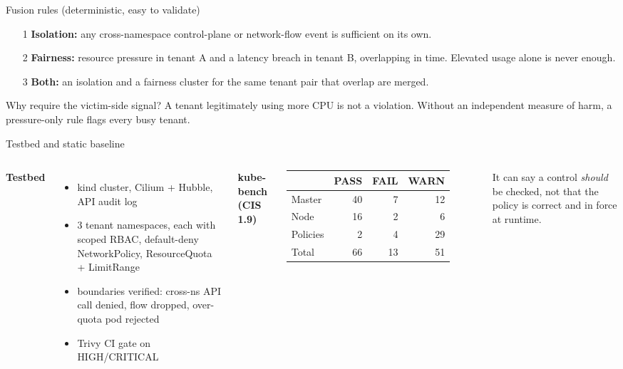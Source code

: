 \documentclass[aspectratio=169,11pt]{beamer}
\begin{document}
\begin{frame}{Fusion rules (deterministic, easy to validate)}
\begin{enumerate}
\item[\alert{1}] \textbf{Isolation:} any cross-namespace control-plane or network-flow event is sufficient on its own.
\item[\alert{2}] \textbf{Fairness:} resource pressure in tenant A \alert{and} a latency breach in tenant B, overlapping in time. Elevated usage alone is never enough.
\item[\alert{3}] \textbf{Both:} an isolation and a fairness cluster for the same tenant pair that overlap are merged.
\end{enumerate}
\vspace{3mm}
\begin{block}{Why require the victim-side signal?}
A tenant legitimately using more CPU is not a violation. Without an independent measure of harm, a pressure-only rule flags every busy tenant.
\end{block}
\end{frame}

\begin{frame}{Testbed and static baseline}
\begin{columns}[T]
\textbf{Testbed}
\begin{itemize}
\item kind cluster, Cilium + Hubble, API audit log
\item 3 tenant namespaces, each with scoped RBAC, default-deny NetworkPolicy, ResourceQuota + LimitRange
\item boundaries verified: cross-ns API call denied, flow dropped, over-quota pod rejected
\item Trivy CI gate on HIGH/CRITICAL
\end{itemize}
\textbf{kube-bench (CIS 1.9)}\par\vspace{1mm}
\small
\begin{tabular}{lrrr}
\toprule
 & PASS & FAIL & WARN\\
\midrule
Master & 40 & 7 & 12\\
Node & 16 & 2 & 6\\
Policies & 2 & 4 & \alert{29}\\
\midrule
Total & 66 & 13 & 51\\
\bottomrule
\end{tabular}
\vspace{1mm}

\footnotesize It can say a control \emph{should} be checked, not that the policy is correct and in force at runtime.
\end{columns}
\end{frame}
\end{document}
